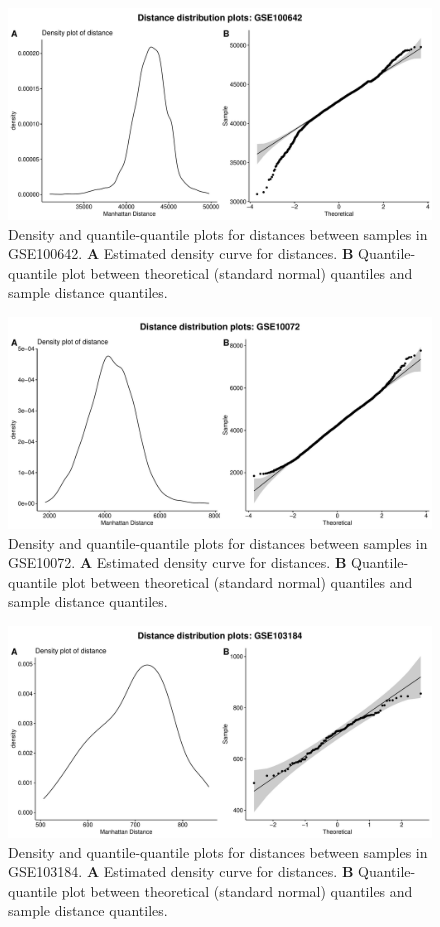 \documentclass[10pt,letterpaper]{article}\usepackage[]{graphicx}\usepackage[]{color}
\begin{document}
\begin{figure}[H]
	\includegraphics[width=\textwidth]{manhattan-distance_hist_GSE100642.pdf}
	\caption{Density and quantile-quantile plots for distances between samples in GSE100642. \textbf{A} Estimated density curve for distances. \textbf{B} Quantile-quantile plot between theoretical (standard normal) quantiles and sample distance quantiles.}
\end{figure}

\begin{figure}[H]
	\includegraphics[width=\textwidth]{manhattan-distance_hist_GSE10072.pdf}
	\caption{Density and quantile-quantile plots for distances between samples in GSE10072. \textbf{A} Estimated density curve for distances. \textbf{B} Quantile-quantile plot between theoretical (standard normal) quantiles and sample distance quantiles.}
\end{figure}

\begin{figure}[H]
	\includegraphics[width=\textwidth]{manhattan-distance_hist_GSE103184.pdf}
	\caption{Density and quantile-quantile plots for distances between samples in GSE103184. \textbf{A} Estimated density curve for distances. \textbf{B} Quantile-quantile plot between theoretical (standard normal) quantiles and sample distance quantiles.}
\end{figure}
\end{document}
